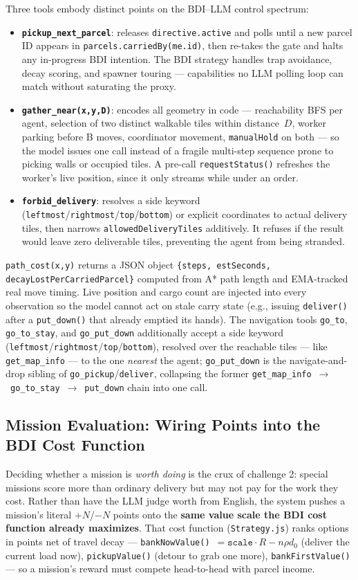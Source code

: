 Three tools embody distinct points on the BDI–LLM control spectrum:
\begin{itemize}
    \item \textbf{\texttt{pickup\_next\_parcel}}: releases \texttt{directive.active} and polls until a new parcel ID appears in \texttt{parcels.carriedBy(me.id)}, then re-takes the gate and halts any in-progress BDI intention. The BDI strategy handles trap avoidance, decay scoring, and spawner touring — capabilities no LLM polling loop can match without saturating the proxy.
    \item \textbf{\texttt{gather\_near(x,y,D)}}: encodes all geometry in code — reachability BFS per agent, selection of two distinct walkable tiles within distance~$D$, worker parking before B moves, coordinator movement, \texttt{manualHold} on both — so the model issues one call instead of a fragile multi-step sequence prone to picking walls or occupied tiles. A pre-call \texttt{requestStatus()} refreshes the worker's live position, since it only streams while under an order.
    \item \textbf{\texttt{forbid\_delivery}}: resolves a side keyword (\texttt{leftmost}/\texttt{rightmost}/\texttt{top}/\texttt{bottom}) or explicit coordinates to actual delivery tiles, then narrows \texttt{allowedDeliveryTiles} additively. It refuses if the result would leave zero deliverable tiles, preventing the agent from being stranded.
\end{itemize}
\texttt{path\_cost(x,y)} returns a JSON object \texttt{\{steps, estSeconds, decayLostPerCarriedParcel\}} computed from A* path length and EMA-tracked real move timing. Live position and cargo count are injected into every observation so the model cannot act on stale carry state (e.g., issuing \texttt{deliver()} after a \texttt{put\_down()} that already emptied its hands). The navigation tools \texttt{go\_to}, \texttt{go\_to\_stay}, and \texttt{go\_put\_down} additionally accept a side keyword (\texttt{leftmost}/\texttt{rightmost}/\texttt{top}/\texttt{bottom}), resolved over the reachable tiles --- like \texttt{get\_map\_info} --- to the one \textit{nearest} the agent; \texttt{go\_put\_down} is the navigate-and-drop sibling of \texttt{go\_pickup}/\texttt{deliver}, collapsing the former \texttt{get\_map\_info}~$\to$~\texttt{go\_to\_stay}~$\to$~\texttt{put\_down} chain into one call.

\subsection{Mission Evaluation: Wiring Points into the BDI Cost Function}
Deciding whether a mission is \textit{worth doing} is the crux of challenge 2: special missions score more than ordinary delivery but may not pay for the work they cost. Rather than have the LLM judge worth from English, the system pushes a mission's literal $+N$/$-N$ points onto the \textbf{same value scale the BDI cost function already maximizes}. That cost function (\texttt{Strategy.js}) ranks options in points net of travel decay --- \texttt{bankNowValue()}~$=\texttt{scale}\cdot R - n\rho d_0$ (deliver the current load now), \texttt{pickupValue()} (detour to grab one more), \texttt{bankFirstValue()} --- so a mission's reward must compete head-to-head with parcel income.

